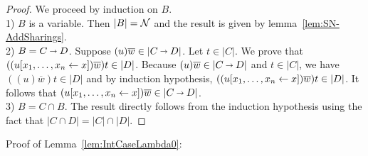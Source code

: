 \documentclass{llncs} %
\begin{document}
\begin{proof}
 We proceed by induction on $B$.
\\
1) $B$ is a variable. Then $|B| = \mathcal{N}$ and the result is given by lemma~\ref{lem:SN-AddSharings}.
\\
2) $B= C\vlim D$.
Suppose $(u)\overline{w} \in |C\vlim D|$. Let $t\in|C|$. We prove that  $((u\share xx)\overline{w})t \in |D|$. Because $(u)\overline{w} \in |C\vlim D|$ and $t\in|C|$, we have $((u)\overline{w})t \in |D|$ and by induction hypothesis, $((u\share xx)\overline{w})t \in |D|$. It follows that $(u\share xx)\overline{w} \in |C\vlim D|$.
\\
3) $B= C\cap B$.
The result directly follows from the induction hypothesis using the fact that $|C\cap D| = |C|\cap|D|$.

\end{proof}


Proof of Lemma~\ref{lem:IntCaseLambda0}:
\end{document}
